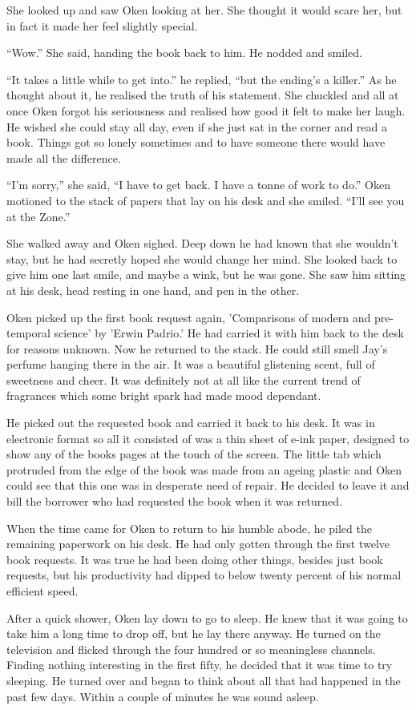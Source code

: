 She looked up and saw Oken looking at her.  She thought it would scare her, but in fact it made her feel slightly special.

``Wow.'' She said, handing the book back to him.  He nodded and smiled.

``It takes a little while to get into.'' he replied, ``but the ending's a killer.''  As he thought about it, he realised the truth of his statement.  She chuckled and all at once Oken forgot his seriousness and realised how good it felt to make her laugh.  He wished she could stay all day, even if she just sat in the corner and read a book.  Things got so lonely sometimes and to have someone there would have made all the difference.

``I'm sorry,'' she said, ``I have to get back.  I have a tonne of work to do.''  Oken motioned to the stack of papers that lay on his desk and she smiled.  ``I'll see you at the Zone.''

She walked away and Oken sighed.  Deep down he had known that she wouldn't stay, but he had secretly hoped she would change her mind.  She looked back to give him one last smile, and maybe a wink, but he was gone.  She saw him sitting at his desk, head resting in one hand, and pen in the other.

Oken picked up the first book request again, 'Comparisons of modern and pre-temporal science' by 'Erwin Padrio.'  He had carried it with him back to the desk for reasons unknown.  Now he returned to the stack.  He could still smell Jay's perfume hanging there in the air.  It was a beautiful glistening scent, full of sweetness and cheer.  It was definitely not at all like the current trend of fragrances which some bright spark had made mood dependant.  

He picked out the requested book and carried it back to his desk.  It was in electronic format so all it consisted of was a thin sheet of e-ink paper, designed to show any of the books pages at the touch of the screen.  The little tab which protruded from the edge of the book was made from an ageing plastic and Oken could see that this one was in desperate need of repair.  He decided to leave it and bill the borrower who had requested the book when it was returned.

When the time came for Oken to return to his humble abode, he piled the remaining paperwork on his desk.  He had only gotten through the first twelve book requests.  It was true he had been doing other things, besides just book requests, but his productivity had dipped to below twenty percent of his normal efficient speed.

After a quick shower, Oken lay down to go to sleep.  He knew that it was going to take him a long time to drop off, but he lay there anyway.  He turned on the television and flicked through the four hundred or so meaningless channels.  Finding nothing interesting in the first fifty, he decided that it was time to try sleeping.  He turned over and began to think about all that had happened in the past few days.  Within a couple of minutes he was sound asleep.



